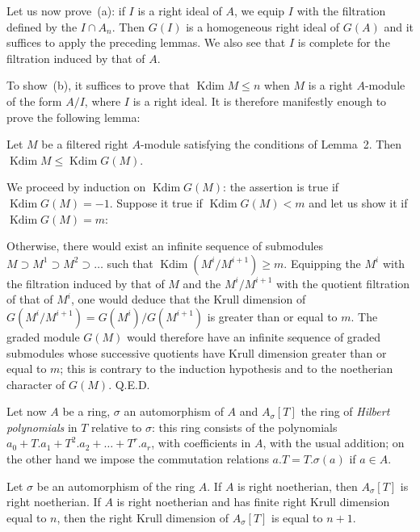 Let us now prove~(a): if $I$ is a right ideal of $A$, we equip $I$
with the filtration defined by the $I\cap A_n$. Then $G(I)$ is a
homogeneous right ideal of $G(A)$ and it suffices to apply the
preceding lemmas. We also see that $I$ is complete for the filtration
induced by that of $A$.

To show~(b), it suffices to prove that
$\operatorname{Kdim}M\le n$ when $M$ is a right $A$-module of the form
$A/I$, where $I$ is a right ideal. It is therefore manifestly enough
to prove the following lemma:

\begin{lemma}
Let $M$ be a filtered right $A$-module satisfying the conditions of
Lemma~2. Then
$\operatorname{Kdim}M\le\operatorname{Kdim}G(M)$.
\end{lemma}

We proceed by induction on $\operatorname{Kdim}G(M)$: the assertion is
true if $\operatorname{Kdim}G(M)=-1$. Suppose it true if
$\operatorname{Kdim}G(M)<m$ and let us show it if
$\operatorname{Kdim}G(M)=m$:

Otherwise, there would exist an infinite sequence of submodules
$M\supset M^1\supset M^2\supset\ldots$ such that
$\operatorname{Kdim}(M^i/M^{i+1})\ge m$. Equipping the $M^i$ with the
filtration induced by that of $M$ and the $M^i/M^{i+1}$ with the
quotient filtration of that of $M^i$, one would deduce that the Krull
dimension of $G(M^i/M^{i+1})=G(M^i)/G(M^{i+1})$ is greater than or
equal to $m$. The graded module $G(M)$ would therefore have an
infinite sequence of graded submodules whose successive quotients have
Krull dimension greater than or equal to $m$; this is contrary to the
induction hypothesis and to the noetherian character of $G(M)$.
\hfill Q.E.D.

Let now $A$ be a ring, $\sigma$ an automorphism of $A$ and
$A_\sigma[T]$ the ring of \emph{Hilbert polynomials} in $T$ relative
to $\sigma$: this ring consists of the polynomials
$a_0+T.a_1+T^2.a_2+\ldots+T^r.a_r$, with coefficients in $A$, with the
usual addition; on the other hand we impose the commutation relations
$a.T=T.\sigma(a)$ if $a\in A$.

\begin{corollary}
Let $\sigma$ be an automorphism of the ring $A$. If $A$ is right
noetherian, then $A_\sigma[T]$ is right noetherian. If $A$ is right
noetherian and has finite right Krull dimension equal to $n$, then the
right Krull dimension of $A_\sigma[T]$ is equal to $n+1$.
\end{corollary}

